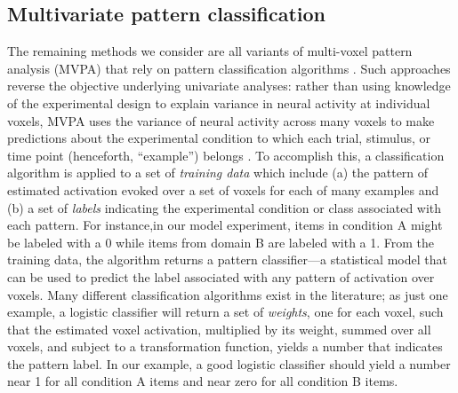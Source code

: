 \subsection{Multivariate pattern classification}

The remaining methods we consider are all variants of multi-voxel pattern analysis (MVPA) that rely on pattern classification algorithms \cite{normanMVPA06}. Such approaches reverse the objective underlying univariate analyses: rather than using knowledge of the experimental design to explain variance in neural activity at individual voxels, MVPA uses the variance of neural activity across many voxels to make predictions about the experimental condition to which each trial, stimulus, or time point (henceforth, ``example'') belongs \cite{mitchell_learning_2004, pereira_machine_2009}. To accomplish this, a classification algorithm is applied to a set of {\em training data} which include (a) the pattern of estimated activation evoked over a set of voxels for each of many examples and (b) a set of {\em labels} indicating the experimental condition or class associated with each pattern. For instance,in our model experiment, items in condition A might be labeled with a 0 while items from domain B are labeled with a 1.  From the training data, the algorithm returns a pattern classifier---a statistical model that can be used to predict the label associated with any pattern of activation over voxels. Many different classification algorithms exist in the literature; as just one example, a logistic classifier will return a set of {\em weights}, one for each voxel, such that the estimated voxel activation, multiplied by its weight, summed over all voxels, and subject to a transformation function, yields a number that indicates the pattern label. In our example, a good logistic classifier should yield a number near 1 for all condition A items and near zero for all condition B items.

